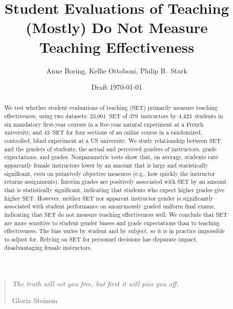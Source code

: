 \documentclass[12pt]{article}
\title{Student Evaluations of Teaching (Mostly) Do Not Measure Teaching Effectiveness}
\author{Anne Boring, Kellie Ottoboni, Philip B.~Stark}
\date{Draft \today}
\begin{document}
\maketitle

\newpage
\begin{quotation}
    \emph{The truth will set you free, but first it will piss you off.}
    
     \hfill Gloria Steinem
\end{quotation}

\begin{abstract}

We test whether student evaluations of teaching (SET) 
primarily measure teaching effectiveness, using 
two datasets:
23,001~SET of 379~instructors by 4,423~students in six 
mandatory first-year courses in a five-year natural experiment at a French university, 
and
43~SET for four sections of an online course in a randomized, controlled, 
blind experiment at a US university.
We study relationship between SET and the genders of students, the actual and
perceived genders of instructors, grade expectations, and grades.
Nonparametric tests show that, on average, students rate apparently female instructors lower 
by an amount that is 
large and statistically significant, even on putatively objective measures (e.g., how
quickly the instructor returns assignments).
Interim grades are positively associated with SET
by an amount that is statistically significant, indicating that students who expect
higher grades give higher SET.
However, neither SET nor apparent instructor gender is significantly associated 
with student performance on anonymously graded uniform final exams, indicating
that SET do not measure teaching effectiveness well. 
We conclude that SET are more sensitive to student gender biases and grade 
expectations than to teaching effectiveness.
The bias varies by student and by subject, so it is in practice impossible to adjust for. 
Relying on SET for personnel decisions has disparate impact, disadvantaging 
female instructors.




\end{abstract}
\end{document}
